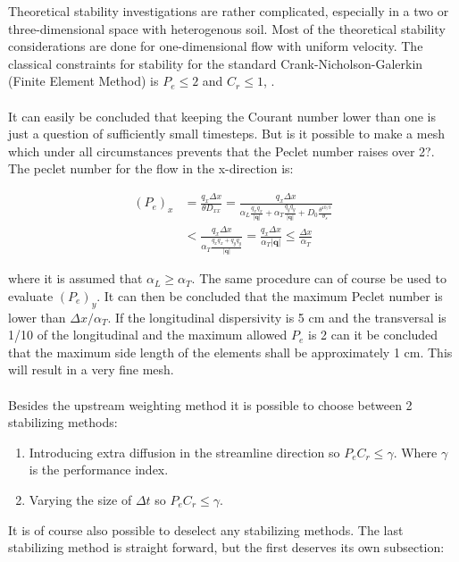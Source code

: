\documentclass{report}
\begin{document}
Theoretical stability investigations are rather complicated, especially
in a two or three-dimensional space with heterogenous soil. Most of
the theoretical stability considerations are done for one-dimensional
flow with uniform velocity. The classical constraints for stability for
the standard Crank-Nicholson-Galerkin (Finite Element Method) is
$P_e\leq 2$ and $C_r \leq 1$, \cite{Perrochet}.\\
\\
It can easily be concluded that keeping the Courant number lower
than one is just a question of sufficiently small timesteps. But is it
possible to make a mesh which under all circumstances prevents
that the Peclet number raises over 2?. The peclet number for the
flow in the x-direction is:

\begin{equation}
\begin{split}
(P_e)_x&=\frac{q_x \Delta x}{\theta D_{xx}}=\frac{q_x \Delta x}{\alpha_L
  \frac{q_xq_x}{|\mathbf{q}|}+\alpha_T\frac{q_yq_y}{|\mathbf{q}|}+D_0\frac{\theta^{10/3}}{\theta_s}}\\
& <\frac{q_x \Delta x}{\alpha_T\frac{q_xq_x+q_yq_y}{|\mathbf{q}|}}
  = \frac{q_x \Delta x}{\alpha_T |\mathbf{q}|} \leq \frac{\Delta x}{\alpha_T}
\end{split}
\end{equation}

where it is assumed that $\alpha_L \geq  \alpha_T$. The same
procedure can of course be used to evaluate $(P_e)_y$. It can then
be concluded that the maximum Peclet number is lower than
$\Delta x /\alpha_T$. If the longitudinal dispersivity is 5 cm and the
transversal is 1/10 of the longitudinal and the maximum allowed
$P_e$ is 2 can it be concluded that the maximum side length of the
elements shall be approximately 1 cm. This will result in a very fine
mesh.\\
\\
Besides the upstream weighting method it is possible to choose
between 2 stabilizing methods:

\begin{enumerate}
\item Introducing extra diffusion in the streamline direction so
    $P_eC_r\leq\gamma$. Where $\gamma$ is the performance
    index. \item Varying the size of $\Delta t$ so
    $P_eC_r\leq\gamma$.
\end{enumerate}

It is of course also possible to deselect any stabilizing methods. The
last stabilizing method is straight forward, but the first deserves its
own subsection:
\end{document}
